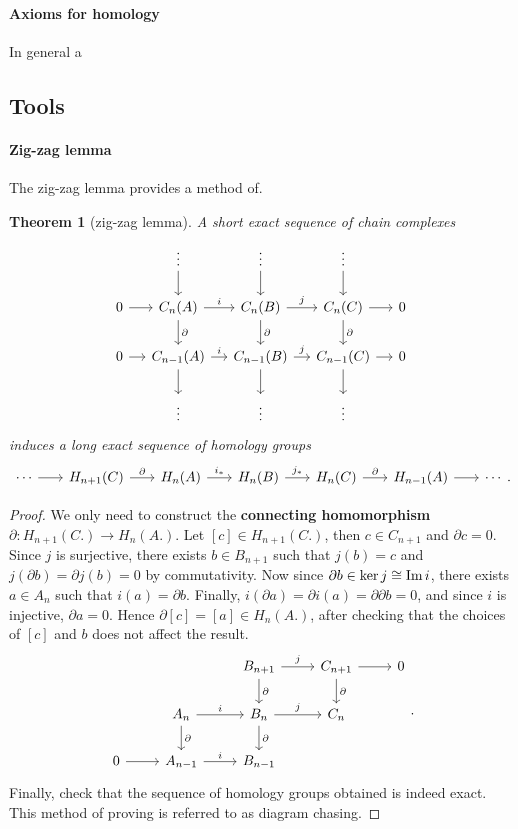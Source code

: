\documentclass[11pt]{article}
\theoremstyle{definition}
\theoremstyle{plain}
\newtheorem{theorem}{Theorem}[section]
\newcommand{\im}{\textup{Im}\,}
\begin{document}
\paragraph{Axioms for homology}

In general a

\subsection{Tools}

\paragraph{Zig-zag lemma}

The zig-zag lemma provides a method of.

\begin{theorem}[zig-zag lemma]
A short exact sequence of chain complexes
\[\begin{tikzcd}[column sep=small]
&\vdots\arrow{d}&\vdots\arrow{d}&\vdots\arrow{d}\\
0\arrow{r}&C_n(A)\arrow{d}{\partial}\arrow{r}{i}&C_n(B)\arrow{d}{\partial}\arrow{r}{j}&C_n(C)\arrow{d}{\partial}\arrow{r}&0\\
0\arrow{r}&C_{n-1}(A)\arrow{d}\arrow{r}{i}&C_{n-1}(B)\arrow{d}\arrow{r}{j}&C_{n-1}(C)\arrow{d}\arrow{r}&0\\
&\vdots&\vdots&\vdots
\end{tikzcd}\]
induces a long exact sequence of homology groups
\[\begin{tikzcd}[column sep=scriptsize]
\cdots\arrow{r}&H_{n+1}(C)\arrow{r}{\partial}&H_n(A)\arrow{r}{i_\ast}&H_n(B)\arrow{r}{j_\ast}&H_n(C)\arrow{r}{\partial}&H_{n-1}(A)\arrow{r}&\cdots
\end{tikzcd}.\]
\end{theorem}
\begin{proof}
We only need to construct the \textbf{connecting homomorphism} $\partial:H_{n+1}(C.)\to H_n(A.)$. Let $[c]\in H_{n+1}(C.)$, then $c\in C_{n+1}$ and $\partial c=0$. Since $j$ is surjective, there exists $b\in B_{n+1}$ such that $j(b)=c$ and $j(\partial b)=\partial j(b)=0$ by commutativity. Now since $\partial b\in\ker j\cong\im i$, there exists $a\in A_n$ such that $i(a)=\partial b$. Finally, $i(\partial a)=\partial i(a)=\partial\partial b=0$, and since $i$ is injective, $\partial a=0$. Hence $\partial[c]=[a]\in H_n(A.)$, after checking that the choices of $[c]$ and $b$ does not affect the result.
\[\begin{tikzcd}
&&B_{n+1}\arrow{d}{\partial}\arrow{r}{j}&C_{n+1}\arrow{d}{\partial}\arrow{r}&0\\
&A_n\arrow{d}{\partial}\arrow{r}{i}&B_n\arrow{d}{\partial}\arrow{r}{j}&C_n\\
0\arrow{r}&A_{n-1}\arrow{r}{i}&B_{n-1}
\end{tikzcd}.\]
Finally, check that the sequence of homology groups obtained is indeed exact. This method of proving is referred to as diagram chasing.
\end{proof}
\end{document}
